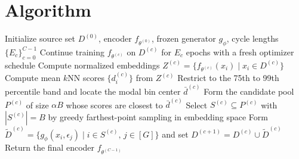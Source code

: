 \documentclass{article}
\newcommand{\method}{BRIDGE}
\begin{document}
\section{Algorithm}
\begin{algorithm}[H]
\caption{\method\ training loop with mode-window selection}
\label{alg:bridge}
\begin{algorithmic}[1]
\STATE Initialize source set $D^{(0)}$, encoder $f_{\theta^{(0)}}$, frozen generator $g_{\phi}$, cycle lengths $\{E_c\}_{c=0}^{C-1}$
    \STATE Continue training $f_{\theta^{(c)}}$ on $D^{(c)}$ for $E_c$ epochs with a fresh optimizer schedule
        \STATE Compute normalized embeddings $Z^{(c)} = \{f_{\theta^{(c)}}(x_i) \mid x_i \in D^{(c)}\}$
        \STATE Compute mean $k$NN scores $\{d_i^{(c)}\}$ from $Z^{(c)}$
        \STATE Restrict to the 75th to 99th percentile band and locate the modal bin center $\bar d^{(c)}$
        \STATE Form the candidate pool $P^{(c)}$ of size $\alpha B$ whose scores are closest to $\bar d^{(c)}$
        \STATE Select $S^{(c)} \subseteq P^{(c)}$ with $|S^{(c)}| = B$ by greedy farthest-point sampling in embedding space
        \STATE Form $\widetilde{D}^{(c)} = \{g_{\phi}(x_i, \epsilon_j) \mid i \in S^{(c)},\, j \in [G]\}$ and set $D^{(c+1)} = D^{(c)} \cup \widetilde{D}^{(c)}$
    \ENDIF
\ENDFOR
\STATE Return the final encoder $f_{\theta^{(C-1)}}$
\end{algorithmic}
\end{algorithm}

\FloatBarrier
\end{document}
